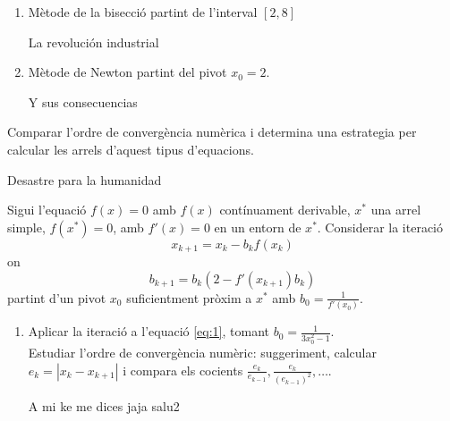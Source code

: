 \documentclass[a4paper, 12pt]{article}
\begin{document}
\begin{exercici}
\begin{enumerate}[label=\alph*)]
            \begin{enumerate}
                \item Mètode de la bisecció partint de l'interval $\left[2,8\right]$\\
                \begin{solucio}
                    La revolución industrial
                \end{solucio}
                \item Mètode de Newton partint del pivot $x_0 = 2$.\\
                \begin{solucio}
                    Y sus consecuencias
                \end{solucio}
            \end{enumerate}
            Comparar l'ordre de convergència numèrica i determina una estrategia per calcular les
            arrels d'aquest tipus d'equacions.\\
            \begin{solucio}
                Desastre para la humanidad
            \end{solucio}
        \end{enumerate}
    \end{exercici}
    \newpage
    \begin{exercici}
        Sigui l'equació $f\left(x\right) = 0$ amb $f\left(x\right)$ contínuament derivable, $x^*$
        una arrel simple, $f\left(x^*\right) = 0$, amb $f'\left(x\right) = 0$ en un entorn de $x^*$.
        Considerar la iteració
        \begin{displaymath}
            x_{k+1} = x_k - b_kf\left(x_k\right) 
        \end{displaymath}
        on
        \begin{displaymath}
            b_{k+1} = b_k\left(2-f'\left(x_{k+1}\right)b_k\right)
        \end{displaymath}
        partint d'un pivot $x_0$ suficientment pròxim a $x^*$ amb $b_0 = \frac{1}{f'\left(x_0\right) }$.
        \begin{enumerate}[label=\alph*)]
            \item Aplicar la iteració a l'equació \eqref{eq:1}, tomant $b_0 = \frac{1}{3x^2_0-1}$.\\
            Estudiar l'ordre de convergència numèric: suggeriment, calcular $e_k = \left\lvert x_k-x_{k+1}\right\rvert$
            i compara els cocients $\frac{e_k}{e_{k-1}}, \frac{e_k}{\left(e_{k-1}\right)^2}, \dots$.\\
            \begin{solucio}
                A mi ke me dices jaja salu2
            \end{solucio}
        \end{enumerate}
    \end{exercici}
\end{document}

